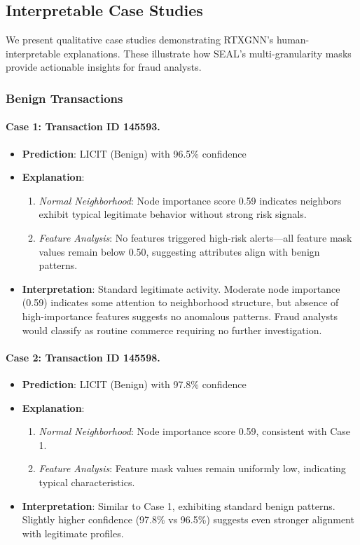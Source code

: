 \subsection{Interpretable Case Studies}
\label{subsec:case_studies}

We present qualitative case studies demonstrating RTXGNN's human-interpretable explanations. These illustrate how SEAL's multi-granularity masks provide actionable insights for fraud analysts.

\subsubsection{Benign Transactions}

\paragraph{Case 1: Transaction ID 145593.}
\begin{itemize}
    \item \textbf{Prediction}: LICIT (Benign) with 96.5\% confidence
    \item \textbf{Explanation}:
    \begin{enumerate}
        \item \textit{Normal Neighborhood}: Node importance score 0.59 indicates neighbors exhibit typical legitimate behavior without strong risk signals.
        \item \textit{Feature Analysis}: No features triggered high-risk alerts—all feature mask values remain below 0.50, suggesting attributes align with benign patterns.
    \end{enumerate}
    \item \textbf{Interpretation}: Standard legitimate activity. Moderate node importance (0.59) indicates some attention to neighborhood structure, but absence of high-importance features suggests no anomalous patterns. Fraud analysts would classify as routine commerce requiring no further investigation.
\end{itemize}

\paragraph{Case 2: Transaction ID 145598.}
\begin{itemize}
    \item \textbf{Prediction}: LICIT (Benign) with 97.8\% confidence
    \item \textbf{Explanation}:
    \begin{enumerate}
        \item \textit{Normal Neighborhood}: Node importance score 0.59, consistent with Case 1.
        \item \textit{Feature Analysis}: Feature mask values remain uniformly low, indicating typical characteristics.
    \end{enumerate}
    \item \textbf{Interpretation}: Similar to Case 1, exhibiting standard benign patterns. Slightly higher confidence (97.8\% vs 96.5\%) suggests even stronger alignment with legitimate profiles.
\end{itemize}

